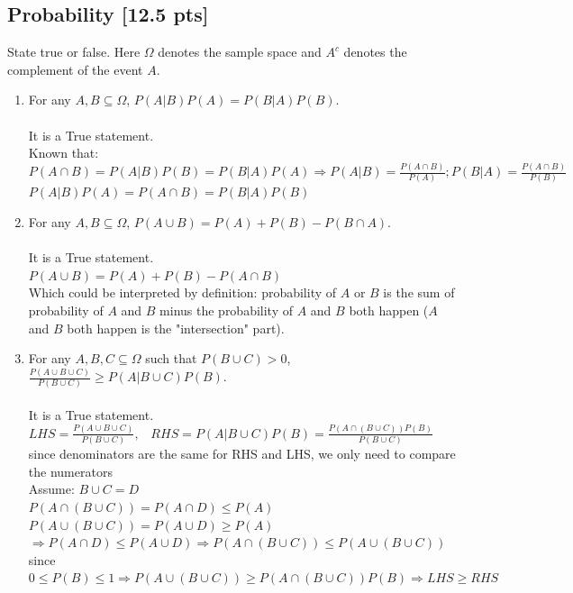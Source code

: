 \documentclass[a4paper]{article}
\theoremstyle{definition}
\newenvironment{soln}{
	\leavevmode\color{blue}\ignorespaces
}{}
\begin{document}
	\subsection{Probability [12.5 pts]}
	State true or false. Here $\Omega$ denotes the sample space and $A^c$ denotes the complement of the event $A$.
	\begin{enumerate}
		\item For any $A, B \subseteq \Omega$, $P(A|B)P(A) = P(B|A)P(B)$.\\
		\begin{soln}\\
			It is a True statement. \\
		Known that: $P(A \cap B) = P(A|B) P(B) = P(B|A) P(A) \Rightarrow P(A|B) = \frac{P(A \cap B)}{P(A)}; P(B|A) = \frac{P(A \cap B)}{P(B)}$\\
		$P(A|B)P(A) = P(A \cap B) = P(B|A)P(B)$
		\end{soln}
		
		\item For any $A, B \subseteq \Omega$, $P(A \cup B) = P(A) + P(B) - P(B \cap A)$.\\         
		\begin{soln}\\
			It is a True statement. \\
		$P(A \cup B) = P(A) + P(B) - P(A \cap B)$\\
		Which could be interpreted by definition: probability of $A$ or $B$ is the sum of probability of $A$ and $B$ minus the probability of $A$ and $B$ both happen ($A$ and $B$ both happen is the "intersection" part).
		\end{soln}
		
		\item For any $A, B, C \subseteq \Omega$ such that $P(B \cup C) > 0$,
		$\frac{P(A \cup B \cup C)}{P(B \cup C)} \geq P(A | B \cup C) P(B)$.\\ 
		\begin{soln}\\
		It is a True statement. \\
		$LHS = \frac{P(A \cup B \cup C)}{P(B \cup C)}, \;\;\; RHS = P(A|B \cup C) P(B) =\frac{P(A \cap (B \cup C)) P(B)}{P(B \cup C)}\;\;$ since denominators are the same for RHS and LHS, we only need to compare the numerators\\
		Assume: $B \cup C = D$\\
		$P(A \cap (B \cup C)) = P(A \cap D) \leq P(A)$\\
		$P(A \cup (B \cup C)) = P(A \cup D) \geq P(A)$\\
		$\Rightarrow P(A \cap D) \leq P(A \cup D) \Rightarrow P(A \cap (B \cup C)) \leq P(A \cup (B \cup C))$\\
		since $0 \leq P(B) \leq 1 \Rightarrow P(A \cup (B \cup C)) \geq P(A \cap (B \cup C)) P(B)\Rightarrow LHS \geq RHS$\\
		\end{soln}
		

\end{enumerate}
\end{document}
